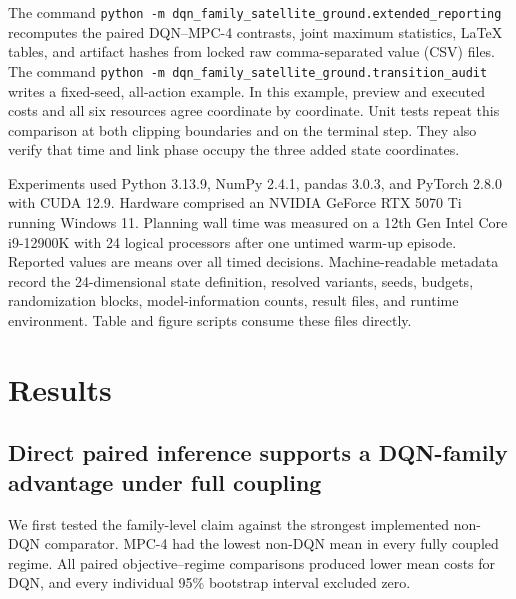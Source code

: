 \documentclass[remotesensing,article,submit,moreauthors]{Definitions/mdpi}
\begin{document}
The command \texttt{python -m dqn\_family\_satellite\_ground.\allowbreak extended\_reporting} recomputes the \DQNvsMPCContrastCount{} paired DQN--MPC-4 contrasts, joint maximum statistics, LaTeX tables, and artifact hashes from locked raw comma-separated value (CSV) files. The command \texttt{python -m dqn\_family\_satellite\_ground.\allowbreak transition\_audit} writes a fixed-seed, all-action example. In this example, preview and executed costs and all six resources agree coordinate by coordinate. Unit tests repeat this comparison at both clipping boundaries and on the terminal step. They also verify that time and link phase occupy the three added state coordinates.

Experiments used Python 3.13.9, NumPy 2.4.1, pandas 3.0.3, and PyTorch 2.8.0 with CUDA 12.9. Hardware comprised an NVIDIA GeForce RTX 5070 Ti running Windows 11. Planning wall time was measured on a 12th Gen Intel Core i9-12900K with 24 logical processors after one untimed warm-up episode. Reported values are means over all timed decisions. Machine-readable metadata record the 24-dimensional state definition, resolved variants, seeds, budgets, randomization blocks, model-information counts, result files, and runtime environment. Table and figure scripts consume these files directly.

\section{Results}
\label{sec:results}

\subsection{Direct paired inference supports a DQN-family advantage under full coupling}

We first tested the family-level claim against the strongest implemented non-DQN comparator. MPC-4 had the lowest non-DQN mean in every fully coupled regime. All \DQNvsMPCContrastCount{} paired objective--regime comparisons produced lower mean costs for DQN, and every individual 95\% bootstrap interval excluded zero.

\begin{table}[H]
\centering
\caption{Episode total cost under the internally consistent synthetic generator. For learned policies, standard deviation (SD) is calculated across 20 independently trained model-seed blocks after within-seed trace averaging. For deterministic non-learned policies, SD is calculated across 20 disjoint trace namespaces and does not represent training variability. These quantities describe different sources of variation and are not directly comparable as inferential uncertainty. All learned policies were trained only at nominal $c=1$; static and reduced-coupling rows are transfers without retraining. MPC-4 is exact only for its stated four-step perfect-forecast objective. Lower values are better.}
\label{tab:main}
\resizebox{\textwidth}{!}{}
\end{table}
\end{document}
